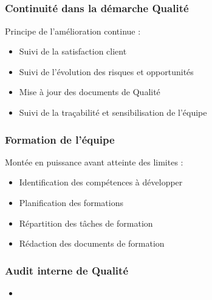 \speaker{\Pierre}

\subsection{} %


\begin{frame}
\frametitle{Continuité dans la démarche Qualité}
Principe de l'amélioration continue :
\begin{itemize}
\item Suivi de la satisfaction client
\item Suivi de l'évolution des risques et opportunités
\item Mise à jour des documents de Qualité
\item Suivi de la traçabilité et sensibilisation de l'équipe
\end{itemize}
\end{frame}


\begin{frame}
\frametitle{Formation de l'équipe}
Montée en puissance avant atteinte des limites :
\begin{itemize}
\item Identification des compétences à développer
\item Planification des formations
\item Répartition des tâches de formation
\item Rédaction des documents de formation
\end{itemize}
\end{frame}


\begin{frame}
\frametitle{Audit interne de Qualité}

\begin{itemize}
\item 
\end{itemize}
\end{frame}





